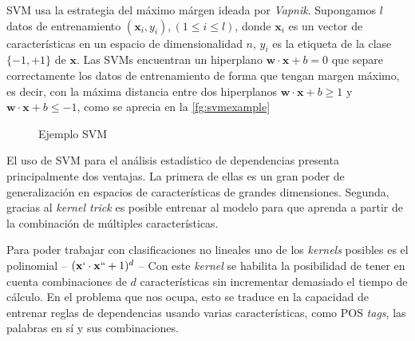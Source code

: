 \ac{SVM} usa la estrategia del máximo márgen ideada por
\emph{Vapnik}. Supongamos $l$ datos de entrenamiento
$(\mathbf{x}_i,y_i), (1 \leq i \leq l)$, donde $\mathbf{x}_i$ es un vector de
características en un espacio de dimensionalidad $n$, $y_i$ es la etiqueta de la
clase $\{-1, +1\}$ de $\mathbf{x}$. Las \acp{SVM} encuentran un hiperplano
$\mathbf{w}\cdot \mathbf{x} + b = 0$ que separe correctamente los datos de
entrenamiento de forma que tengan margen máximo, es decir, con la máxima
distancia entre dos hiperplanos $\mathbf{w}\cdot \mathbf{x} + b \geq 1$ y
$\mathbf{w}\cdot \mathbf{x} + b \leq -1$, como se aprecia en la
\autoref{fg:svmexample}

\begin{figure}[h]
  \centering
  \caption{Ejemplo \ac{SVM}}
  \label{fg:svmexample}
\end{figure}

El uso de \ac{SVM} para el análisis estadístico de dependencias presenta
principalmente dos ventajas. La primera de ellas es un gran poder de
generalización en espacios de características de grandes dimensiones. Segunda,
gracias al \emph{kernel trick} es posible entrenar al modelo para que aprenda a
partir de la combinación de múltiples características.

Para poder trabajar con clasificaciones no lineales uno de los \emph{kernels}
posibles es el polinomial -- $(\mathbf{x}` \cdot \mathbf{x}`` + 1)^d$ -- Con
este \emph{kernel} se habilita la posibilidad de tener en cuenta combinaciones
de $d$ características sin incrementar demasiado el tiempo de cálculo. En el
problema que nos ocupa, esto se traduce en la capacidad de entrenar reglas de
dependencias usando varias características, como \ac{POS} \emph{tags}, las
palabras en sí y sus combinaciones.

